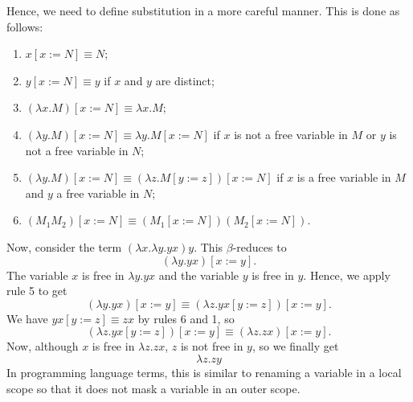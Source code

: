\documentclass[a4paper, openany]{memoir}
\theoremstyle{definition}
\begin{document}
    Hence, we need to define substitution in a more careful manner. This is done as follows:
    \begin{enumerate}
        \item $x[x := N] \equiv N$;
        \item $y[x := N] \equiv y$ if $x$ and $y$ are distinct;
        \item $(\lambda x.M)[x := N] \equiv \lambda x.M$;
        \item $(\lambda y.M)[x := N] \equiv \lambda y. M[x := N]$ if $x$ is not a free variable in $M$ or $y$ is not a free variable in $N$;
        \item $(\lambda y.M)[x := N] \equiv (\lambda z.M[y:=z])[x := N]$ if $x$ is a free variable in $M$ and $y$ a free variable in $N$;
        \item $(M_1 M_2)[x := N] \equiv (M_1[x := N])(M_2[x := N])$.
    \end{enumerate}
    
    Now, consider the term $(\lambda x.\lambda y.yx)y$. This $\beta$-reduces to
    \[(\lambda y.yx)[x := y].\]
    The variable $x$ is free in $\lambda y.yx$ and the variable $y$ is free in $y$. Hence, we apply rule 5 to get
    \[(\lambda y.yx)[x := y] \equiv (\lambda z.yx[y := z])[x := y].\]
    We have $yx[y := z] \equiv zx$ by rules 6 and 1, so
    \[(\lambda z.yx[y := z])[x := y] \equiv (\lambda z.zx)[x := y].\]
    Now, although $x$ is free in $\lambda z.zx$, $z$ is not free in $y$, so we finally get
    \[\lambda z.zy\]
    In programming language terms, this is similar to renaming a variable in a local scope so that it does not mask a variable in an outer scope.
    
\end{document}
